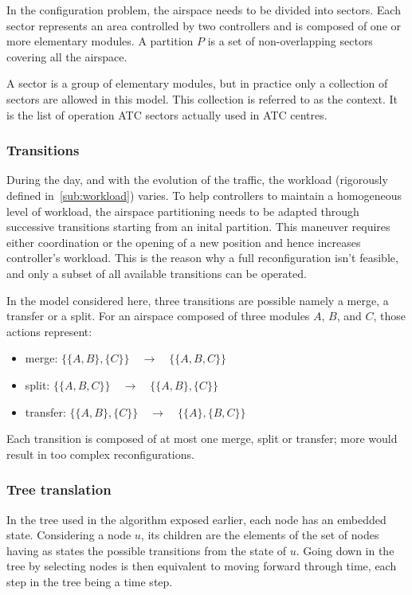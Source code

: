 \documentclass[oneside,twocolumn]{article}
\begin{document}
In the configuration problem, the airspace needs to be divided into sectors. Each
sector represents an area controlled by two controllers and is composed of
one or more elementary modules. A partition $P$ is a set of
non-overlapping sectors covering all the airspace.

A sector is a group of elementary modules, but in practice only a collection
of sectors are allowed in this model. This collection is referred to as the
context. It is the list of operation ATC sectors actually used in ATC centres.

\subsubsection{Transitions}\label{sssec:transitions}

During the day, and with the evolution of the traffic, the workload (rigorously
defined in~\ref{sub:workload}) varies. To help controllers to maintain a
homogeneous level of workload, the airspace partitioning needs to be adapted
through successive transitions starting from an inital partition.
This maneuver requires either coordination or the opening of a new position
and hence increases controller's workload.
This is the reason why a full reconfiguration isn't feasible, and
only a subset of all available transitions can be operated.

In the model considered here, three transitions are possible namely a merge,
a transfer
or a split. For an airspace composed of three modules $A$, $B$, and $C$,
those actions represent:
\begin{itemize}
  \item merge: $\{\{A, B\}, \{C\}\} \quad \rightarrow \quad \{\{A, B, C\}\}$
  \item split: $\{\{A, B, C\}\} \quad \rightarrow \quad \{\{A, B\}, \{C\}\}$
  \item transfer: $\{\{A, B\}, \{C\}\} \quad \rightarrow \quad \{\{A\}, \{B, C\}\}$
\end{itemize}

Each transition is composed of at most one merge, split or transfer; more would
result in too complex reconfigurations.

\subsubsection*{Tree translation}
In the tree used in the algorithm exposed earlier, each node has an embedded
state. Considering a node \(u\), its children are the elements of the set of
nodes having as states the possible transitions from the state of \(u\). Going
down in the tree by selecting nodes is then equivalent to moving forward through
time, each step in the tree being a time step.
\end{document}

